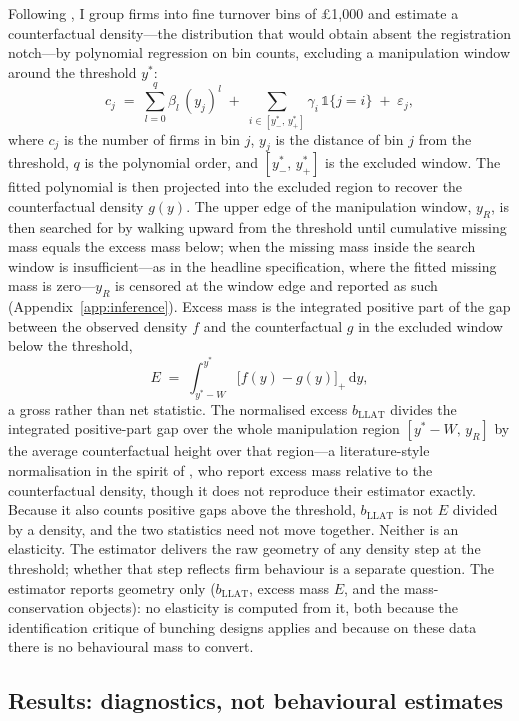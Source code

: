 Following \citet{liuetal2021}, I group firms into fine turnover bins of
\pounds1{,}000 and estimate a counterfactual density---the distribution that would
obtain absent the registration notch---by polynomial regression on bin counts,
excluding a manipulation window around the threshold $y^{*}$:
\[
  c_j \;=\; \sum_{l=0}^{q} \beta_l \, (y_j)^{l}
  \;+\; \sum_{i \in [y^{*}_{-},\, y^{*}_{+}]} \gamma_i \, \mathbb{1}\{j = i\}
  \;+\; \varepsilon_j ,
\]
where $c_j$ is the number of firms in bin $j$, $y_j$ is the distance of bin $j$
from the threshold, $q$ is the polynomial order, and $[y^{*}_{-},\,y^{*}_{+}]$
is the excluded window. The fitted polynomial is then projected into the
excluded region to recover the counterfactual density $g(y)$. The upper edge
of the manipulation window, $y_R$, is then searched for by walking upward from
the threshold until cumulative missing mass equals the excess mass below; when
the missing mass inside the search window is insufficient---as in the headline
specification, where the fitted missing mass is zero---$y_R$ is censored at the
window edge and reported as such (Appendix~\ref{app:inference}). Excess mass is
the integrated positive part of the gap between the observed density $f$ and
the counterfactual $g$ in the excluded window below the threshold,
\[
  E \;=\; \int_{y^{*}-W}^{y^{*}} \bigl[f(y)-g(y)\bigr]_{+}\,\mathrm{d}y ,
\]
a gross rather than net statistic. The normalised excess $b_{\mathrm{LLAT}}$
divides the integrated positive-part gap over the whole manipulation region
$[y^{*}-W,\,y_R]$ by the average counterfactual height over that region---a
literature-style normalisation in the spirit of \citet{liuetal2021}, who report
excess mass relative to the counterfactual density, though it does not
reproduce their estimator exactly. Because it also counts positive gaps above
the threshold, $b_{\mathrm{LLAT}}$ is not $E$ divided by a density, and the two
statistics need not move together. Neither is an elasticity. The estimator
delivers the raw geometry of any
density step at the threshold; whether that step reflects firm behaviour is a
separate question. The estimator reports geometry only ($b_{\mathrm{LLAT}}$,
excess mass $E$, and the mass-conservation objects): no elasticity is computed from it, both
because the identification critique of bunching designs applies
\citep{blomquistetal2021,bertanhaetal2023} and because on these data there is
no behavioural mass to convert.

\subsection{Results: diagnostics, not behavioural estimates}

